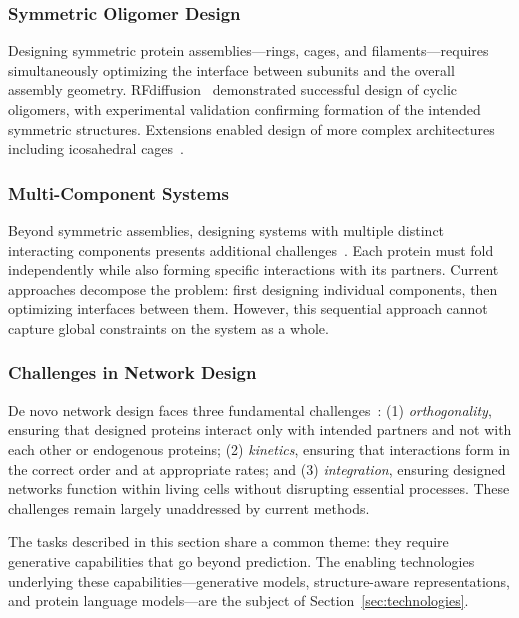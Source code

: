 \subsubsection{Symmetric Oligomer Design}

Designing symmetric protein assemblies---rings, cages, and filaments---requires simultaneously optimizing the interface between subunits and the overall assembly geometry. RFdiffusion~\cite{watson2023rfdiffusion} demonstrated successful design of cyclic oligomers, with experimental validation confirming formation of the intended symmetric structures. Extensions enabled design of more complex architectures including icosahedral cages~\cite{bennett2024symmetric}.

\subsubsection{Multi-Component Systems}

Beyond symmetric assemblies, designing systems with multiple distinct interacting components presents additional challenges~\cite{krishna2024rfaa}. Each protein must fold independently while also forming specific interactions with its partners. Current approaches decompose the problem: first designing individual components, then optimizing interfaces between them. However, this sequential approach cannot capture global constraints on the system as a whole.

\subsubsection{Challenges in Network Design}

De novo network design faces three fundamental challenges~\cite{bennett2024symmetric}: (1) \textit{orthogonality}, ensuring that designed proteins interact only with intended partners and not with each other or endogenous proteins; (2) \textit{kinetics}, ensuring that interactions form in the correct order and at appropriate rates; and (3) \textit{integration}, ensuring designed networks function within living cells without disrupting essential processes. These challenges remain largely unaddressed by current methods.

\vspace{1em}
\noindent
The tasks described in this section share a common theme: they require generative capabilities that go beyond prediction. The enabling technologies underlying these capabilities---generative models, structure-aware representations, and protein language models---are the subject of Section~\ref{sec:technologies}.

